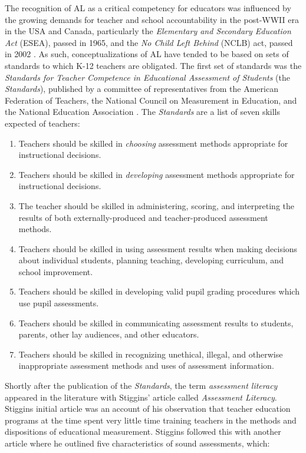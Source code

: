 \documentclass[
]{book}
\providecommand{\tightlist}{%
  \setlength{\itemsep}{0pt}\setlength{\parskip}{0pt}}
\begin{document}
The recognition of AL as a critical competency for educators was influenced by the growing demands for teacher and school accountability in the post-WWII era in the USA and Canada, particularly the \emph{Elementary and Secondary Education Act} (ESEA), passed in 1965, and the \emph{No Child Left Behind} (NCLB) act, passed in 2002 \citep[see][ for a detailed discussion]{delucaPreparingTeachersAge2012}. As such, conceptualizations of AL have tended to be based on sets of standards to which K-12 teachers are obligated. The first set of standards was the \emph{Standards for Teacher Competence in Educational Assessment of Students} (the \emph{Standards}), published by a committee of representatives from the American Federation of Teachers, the National Council on Measurement in Education, and the National Education Association \citep{StandardsTeacherCompetence1990}. The \emph{Standards} are a list of seven skills expected of teachers:

\begin{enumerate}
\def\labelenumi{\arabic{enumi}.}
\tightlist
\item
  Teachers should be skilled in \emph{choosing} assessment methods appropriate for instructional decisions.
\item
  Teachers should be skilled in \emph{developing} assessment methods appropriate for instructional decisions.
\item
  The teacher should be skilled in administering, scoring, and interpreting the results of both externally-produced and teacher-produced assessment methods.
\item
  Teachers should be skilled in using assessment results when making decisions about individual students, planning teaching, developing curriculum, and school improvement.
\item
  Teachers should be skilled in developing valid pupil grading procedures which use pupil assessments.
\item
  Teachers should be skilled in communicating assessment results to students, parents, other lay audiences, and other educators.
\item
  Teachers should be skilled in recognizing unethical, illegal, and otherwise inappropriate assessment methods and uses of assessment information.
\end{enumerate}

Shortly after the publication of the \emph{Standards}, the term \emph{assessment literacy} appeared in the literature with Stiggins' \citeyearpar{stigginsAssessmentLiteracy1991} article called \emph{Assessment Literacy}. Stiggins initial article was an account of his observation that teacher education programs at the time spent very little time training teachers in the methods and dispositions of educational measurement. Stiggins followed this with another article \citep{stigginsAssessmentLiteracy21st1995} where he outlined five characteristics of sound assessments, which:
\end{document}
